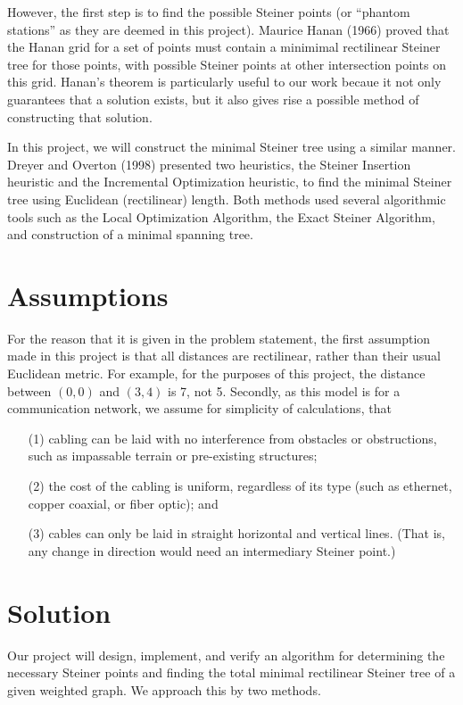 \documentclass[12pt,letterpaper]{article}
\theoremstyle{definition}\newtheorem{defn}[defncounter]{Definition}
\theoremstyle{remark}\newtheorem*{remark}{Remark}
\begin{document}
However, the first step is to find the possible Steiner points (or ``phantom stations'' as they are deemed in this project). Maurice 
Hanan (1966) proved that the Hanan grid for a set of points must contain a minimimal rectilinear Steiner tree for those points, 
with possible Steiner points at other intersection points on this grid. Hanan's theorem is particularly useful to our work becaue 
it not only guarantees that a solution exists, but it also gives rise a possible method of constructing that solution.

In this project, we will construct the minimal Steiner tree using a similar manner. Dreyer and Overton (1998) presented two 
heuristics, the Steiner Insertion heuristic and the Incremental Optimization heuristic, to find the minimal Steiner tree using 
Euclidean (rectilinear) length. Both methods used several algorithmic tools such as the Local Optimization Algorithm, the Exact Steiner 
Algorithm, and construction of a minimal spanning tree.


\section{Assumptions}

For the reason that it is given in the problem statement, the first assumption made in this project is that all distances are 
rectilinear, rather than their usual Euclidean metric. For example, for the purposes of this project, the distance between \((0, 
0)\) and \((3, 4)\) is 7, not 5. Secondly, as this model is for a communication network, we assume for simplicity of calculations, that
\begin{enumerate}
\item[(1)] { cabling can be laid with no interference from obstacles or obstructions, such as impassable terrain or pre-existing
structures; }
\item[(2)] { the cost of the cabling is uniform, regardless of its type (such as ethernet, copper coaxial, or fiber optic); and }
\item[(3)] { cables can only be laid in straight horizontal and vertical lines. (That is, any change in direction would need an intermediary Steiner point.) }
\end{enumerate} 

\section{Solution}
Our project will design, implement, and verify an algorithm for determining the necessary Steiner points and 
finding the total minimal rectilinear Steiner tree of a given weighted graph. We approach this by two methods. 
\end{document}
